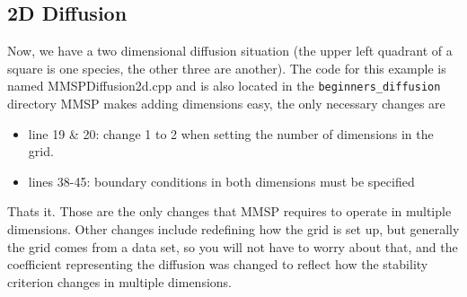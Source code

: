 \documentclass{article}
\begin{document}
\subsection{2D Diffusion}
Now, we have a two dimensional diffusion situation (the upper left quadrant of a square is one species, the other three are another). The code for this example is named MMSPDiffusion2d.cpp and is also located in the {\tt beginners\_diffusion} directory MMSP makes adding dimensions easy, the only necessary changes are
\begin{itemize} \itemsep1pt \parskip0pt 
\item line 19 \& 20: change 1 to 2 when setting the number of dimensions in the grid. 
\item lines 38-45: boundary conditions in both dimensions must be specified
\end{itemize}
Thats it.  Those are the only changes that MMSP requires to operate in multiple dimensions.  Other changes include redefining how the grid is set up, but generally the grid comes from a data set, so you will not have to worry about that, and the coefficient representing the diffusion was changed to reflect how the stability criterion changes in multiple dimensions.
\end{document}
